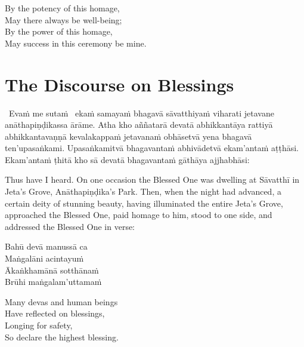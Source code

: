 \begin{english-verses}
  By the potency of this homage,\\
  May there always be well-being;\\
  By the power of this homage,\\
  May success in this ceremony be mine.
\end{english-verses}

\suttaRef{[Thai]}



\section{The Discourse on Blessings}
\label{discorse-on-blessings}

\begin{pali-hang-together}
  \anglebracketleft\ \hspace{-0.5mm}Evaṁ me sutaṁ \hspace{-0.5mm}\anglebracketright\ ekaṁ samayaṁ bhagavā sāvatthiyaṁ viharati jetavane anāthapiṇḍikassa ārāme. Atha kho aññatarā devatā abhikkantāya rattiyā abhikkantavaṇṇā kevalakappaṁ jetavanaṁ obhāsetvā yena bhagavā ten'upasaṅkami. Upasaṅkamitvā bhagavantaṁ abhivādetvā ekam'antaṁ aṭṭhāsi. Ekam'antaṁ ṭhitā kho sā devatā bhagavantaṁ gāthāya ajjhabhāsi:
\end{pali-hang-together}

\begin{english-hang-verses}
  Thus have I heard. On one occasion the Blessed One was dwelling at Sāvatthī in Jeta's Grove, Anāthapiṇḍika's Park. Then, when the night had advanced, a certain deity of stunning beauty, having illuminated the entire Jeta's Grove, approached the Blessed One, paid homage to him, stood to one side, and addressed the Blessed One in verse:
\end{english-hang-verses}

\begin{pali-hang-continued}
  Bahū devā manussā ca\\
  Maṅgalāni acintayuṁ\\
  Ākaṅkhamānā sotthānaṁ\\
  Brūhi maṅgalam'uttamaṁ
\end{pali-hang-continued}

\ifninebythirteen\clearpage\fi

\begin{english-verses}
  Many devas and human beings\\
  Have reflected on blessings,\\
  Longing for safety,\\
  So declare the highest blessing.
\end{english-verses}

